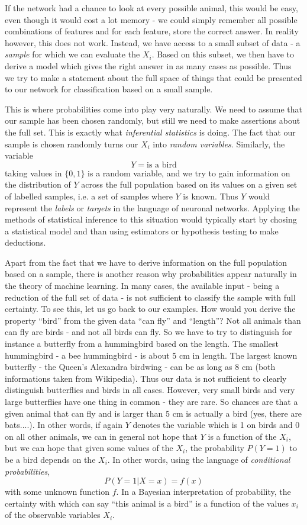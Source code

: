 \documentclass[a4paper, draft]{report}
\numberwithin{section}{chapter}
\numberwithin{equation}{chapter}
\theoremstyle{own}
\theoremstyle{remark}
\begin{document}
If the network had a chance to look at every possible animal, this would be easy, even though it would cost a lot memory - we could simply remember all possible combinations of features and for each feature, store the correct answer. In reality however, this does not work. Instead, we have access to a small subset of data - a {\em sample} for which we can evaluate the $X_i$. Based on this subset, we then have to derive a model which gives the right answer in as many cases as possible. Thus we try to make a statement about the full space of things that could be 
presented to our network for classification based on a small sample. 

This is where probabilities come into play very naturally. We need to assume that our sample has been chosen randomly, but still we need to make assertions about the full set. This is exactly what {\em inferential statistics} is doing. The fact that our sample is chosen randomly turns our $X_i$ into {\em random variables}. Similarly, the variable
$$
Y = \text{is a bird}
$$
taking values in $\{0,1\}$ is a random variable, and we try to gain information on the distribution of $Y$ across the full population based on its values on a given set of labelled samples, i.e. a set of samples where $Y$ is known. Thus $Y$ would represent the {\em labels} or {\em targets} in the language of neuronal networks. Applying the methods of statistical inference to this situation would typically start by chosing a statistical model and than using estimators or hypothesis testing to make deductions.

Apart from the fact that we have to derive information on the full population based on a sample, there is another reason why probabilities appear naturally in the theory of machine learning. In many cases, the available input - being a reduction of the full set of data - is not sufficient to classify the sample with full certainty. To see this, let us go back to our examples. How would you derive the property ``bird'' from the given data ``can fly'' and ``length''? Not all animals than can fly are birds - and not all birds can fly. So we have to try to distinguish for instance a butterfly from a hummingbird based on the length.  The smallest hummingbird - a bee hummingbird - is about 5 cm in length. The largest known butterfly - the Queen's Alexandra birdwing - can be as long as 8 cm (both informations taken from Wikipedia). Thus our data is not sufficient to clearly distinguish butterflies and birds in all cases. However, very small birds and very large butterflies have one thing in common - they are rare. So chances are that a given animal that can fly and is larger than 5 cm is actually a bird (yes, there are bats....). In other words, if again $Y$ denotes the variable which is 1 on birds and 0 on all other animals, we can in general not hope that $Y$ is a function of the $X_i$, but we can hope that given some values of the $X_i$, the probability $P(Y=1)$ to be a bird depends on the $X_i$. In other words, using the language of {\em conditional probabilities}, 
$$
P(Y=1 | X = x) = f(x)
$$
with some unknown function $f$. In a Bayesian interpretation of probability, the certainty with which can say ``this animal is a bird'' is a function of the values $x_i$ of the observable variables $X_i$. 
\end{document}
